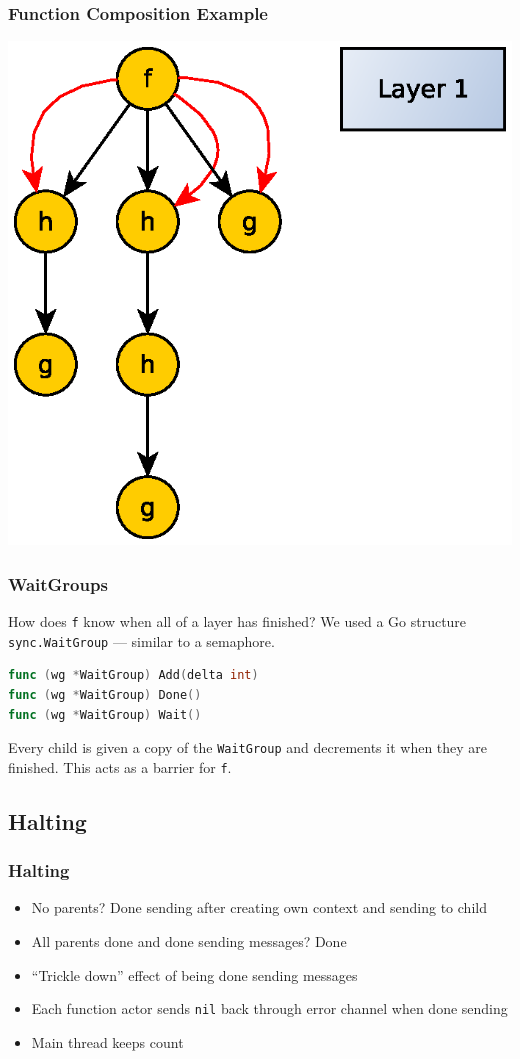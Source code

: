\documentclass{beamer}
\begin{document}
\begin{frame}
  \frametitle{Function Composition Example}
  \centerline{\includegraphics[width=.6\linewidth]{media/inout1.eps}}
\end{frame}

\begin{frame}[fragile]
  \frametitle{WaitGroups}
  
  How does \texttt{f} know when all of a layer has finished? We used a
  Go structure \texttt{sync.WaitGroup} --- similar to a semaphore.

  \begin{lstlisting}[language=Go]
func (wg *WaitGroup) Add(delta int)
func (wg *WaitGroup) Done()
func (wg *WaitGroup) Wait()
  \end{lstlisting}

  \vspace{2em}
  Every child is given a copy of the \texttt{WaitGroup} and
  decrements it when they are finished. This acts as a barrier for \texttt{f}.
\end{frame}


\subsection{Halting}

\begin{frame}
	\frametitle{Halting}
	\begin{itemize}
		\item No parents? Done sending after creating own context and sending
			to child
		\item All parents done and done sending messages? Done
		\item ``Trickle down'' effect of being done sending messages
		\item Each function actor sends \texttt{nil} back through error channel
			when done sending
		\item Main thread keeps count
	\end{itemize}
\end{frame}
\end{document}
